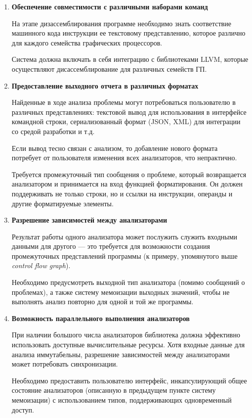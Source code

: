 \documentclass[listings]{labreport}
\begin{document}
\begin{enumerate}
\item \textbf{Обеспечение совместимости с различными наборами команд}

На этапе дизассемблирования программе необходимо знать соответствие
машинного кода инструкции ее текстовому представлению, которое различно для
каждого семейства графических процессоров.

Система должна включать в себя интеграцию с библиотеками LLVM, которые
осуществляют дисассемблирование для различных семейств ГП.

\item \textbf{Предоставление выходного отчета в различных форматах}

Найденные в ходе анализа проблемы могут потребоваться пользователю в различных
представлениях: текстовой вывод для использования в интерфейсе командной строки,
сериализованный формат (JSON, XML) для интеграции со средой разработки и т.д.

Если вывод тесно связан с анализом, то добавление нового формата потребует
от пользователя изменения всех анализаторов, что непрактично.

Требуется промежуточный тип сообщения о проблеме, который возвращается анализатором
и принимается на вход функцией форматирования. Он должен поддерживать не только строки,
но и ссылки на инструкции, операнды и другие форматируемые элементы.

\item \textbf{Разрешение зависимостей между анализаторами}

Результат работы одного анализатора может послужить служить входными данными
для другого — это требуется для возможности создания промежуточных представлений программы
(к примеру, упомянутого выше \textit{control flow graph}).

Необходимо предусмотреть выходной тип анализатора (помимо сообщений о проблемах),
а также систему мемоизации выходных значений, чтобы не выполнять анализ повторно
для одной и той же программы.

\item \textbf{Возможность параллельного выполнения анализаторов}

При наличии большого числа анализаторов библиотека должна эффективно использовать
доступные вычислительные ресурсы. Хотя входные данные для анализа иммутабельны,
разрешение зависимостей между анализаторами может потребовать синхронизации.

Необходимо предоставить пользователю интерфейс, инкапсулирующий общее состояние анализаторов
(описанную в предыдущем пункте систему мемоизации)
с использованием типов, поддерживающих одновременный доступ.


\end{enumerate}
\end{document}
